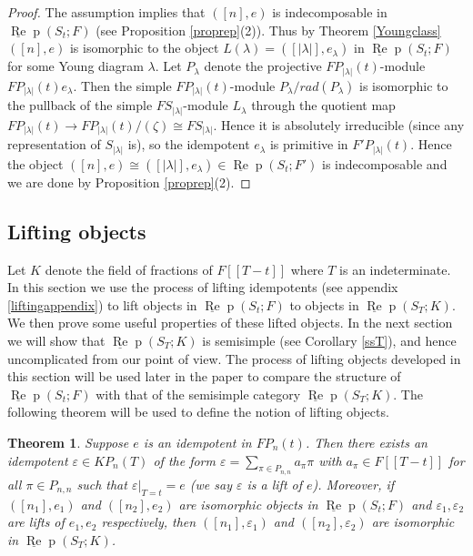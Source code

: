 \documentclass{amsart}
\newtheorem{theorem}{Theorem}[section]
\theoremstyle{definition}
\def\uRep{\underline{\operatorname{Re}}\!\operatorname{p}}
\renewcommand{\1}{_{(1)}}
\renewcommand{\2}{_{(2)}}
\newcommand{\3}{_{(3)}}
\newcommand{\4}{_{(4)}}
\newcommand{\ep}{\varepsilon}
\begin{document}
\begin{proof} The assumption implies that $([n],e)$ is indecomposable in  $\uRep(S_t; F)$ (see Proposition \ref{proprep}(2)).
Thus by Theorem \ref{Youngclass} $([n], e)$ is isomorphic to the object $L(\lambda)=([|\lambda|],e_\lambda)$ in $\uRep(S_t; F)$ for some Young diagram $\lambda$.  Let $P_\lambda$ denote the projective $FP_{|\lambda|}(t)$-module $FP_{|\lambda|}(t)e_\lambda$.  Then the simple $FP_{|\lambda|}(t)$-module $P_\lambda/rad(P_\lambda)$ is isomorphic to the pullback of the simple $FS_{|\lambda|}$-module $L_\lambda$ through the quotient map $FP_{|\lambda|}(t)\to FP_{|\lambda|}(t)/(\zeta)\cong FS_{|\lambda|}$.  Hence  it is absolutely irreducible (since any representation of $S_{|\lambda|}$ is), so the
idempotent $e_\lambda$ is primitive in $F'P_{|\lambda|}(t)$. Hence the object $([n],e)\cong 
([|\lambda|],e_\lambda)\in \uRep(S_t; F')$ is indecomposable and we are done by Proposition \ref{proprep}(2).
\end{proof}




\subsection{Lifting objects}  Let $K$ denote the field of fractions of $F[[T-t]]$ where $T$ is an indeterminate. In this section we use the process of lifting idempotents (see appendix \ref{liftingappendix}) to lift objects in $\uRep(S_t; F)$ to objects in $\uRep(S_T; K)$.  
We then prove some useful properties of these lifted objects.  In the next section we will show that $\uRep(S_T; K)$ is semisimple (see Corollary \ref{ssT}), and hence uncomplicated from our point of view.  The process of  lifting objects developed in this section will be used later in the paper to compare the structure of $\uRep(S_t; F)$ with that of the semisimple category $\uRep(S_T; K)$.  
The following theorem will be used to define the notion of lifting objects.

\begin{theorem}\label{lifttoK} Suppose $e$ is an idempotent in $FP_n(t)$.  Then there exists an idempotent $\ep\in KP_n(T)$ of the form $\ep=\sum_{\pi\in P_{n,n}}a_\pi\pi$ with $a_\pi\in F[[T-t]]$ for all $\pi\in P_{n,n}$ such that $\ep|_{T=t}=e$ (we say $\ep$ is a lift of $e$).  Moreover, if $([n_1], e_1)$ and $([n_2], e_2)$ are isomorphic objects in $\uRep(S_t; F)$ and $\ep_1, \ep_2$ are lifts of $e_1, e_2$ respectively, then $([n_1], \ep_1)$ and $([n_2], \ep_2)$ are isomorphic in $\uRep(S_T; K)$.  
\end{theorem}
\end{document}
